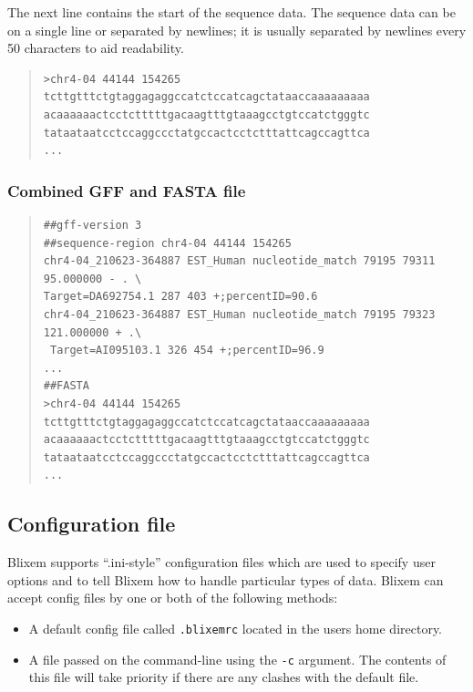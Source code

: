 \documentclass[letterpaper]{article}
\newcommand\textstyleSourceText[1]{\texttt{#1}}
\newcommand\liststyleLi{%
\renewcommand\labelitemi{{\textbullet}}
\renewcommand\labelitemii{{\textbullet}}
\renewcommand\labelitemiii{{\textbullet}}
\renewcommand\labelitemiv{{\textbullet}}
}
\begin{document}
{The next line contains the start of the sequence data. The sequence
data can be on a single line or separated by newlines; it is usually
separated by newlines every 50 characters to aid readability.}

\bigskip

\begin{quote}
\begin{verbatim}
>chr4-04 44144 154265
tcttgtttctgtaggagaggccatctccatcagctataaccaaaaaaaaa
acaaaaaactcctctttttgacaagtttgtaaagcctgtccatctgggtc
tataataatcctccaggccctatgccactcctctttattcagccagttca
...
\end{verbatim}
\end{quote}

{\color[rgb]{0.30980393,0.5058824,0.7411765}\subsubsection[Combined GFF and FASTA file]{Combined GFF and FASTA file}}

\begin{quote}
\begin{verbatim}
##gff-version 3
##sequence-region chr4-04 44144 154265
chr4-04_210623-364887 EST_Human nucleotide_match 79195 79311 95.000000 - . \
Target=DA692754.1 287 403 +;percentID=90.6
chr4-04_210623-364887 EST_Human nucleotide_match 79195 79323 121.000000 + .\
 Target=AI095103.1 326 454 +;percentID=96.9
...
##FASTA
>chr4-04 44144 154265
tcttgtttctgtaggagaggccatctccatcagctataaccaaaaaaaaa
acaaaaaactcctctttttgacaagtttgtaaagcctgtccatctgggtc
tataataatcctccaggccctatgccactcctctttattcagccagttca
...
\end{verbatim}
\end{quote}

{\color[rgb]{0.30980393,0.5058824,0.7411765}\subsection[Configuration file]{Configuration file}}
{Blixem supports {\textquotedblleft}.ini-style{\textquotedblright}
configuration files which are used to specify user options and to tell
Blixem how to handle particular types of data. Blixem can accept
config files by one or both of the following methods:}

\liststyleLi
\begin{itemize}
\item {
A default config file called \textstyleSourceText{\textrm{.blixemrc}}
located in the user{\textquotesingle}s home directory. }
\item {
A file passed on the command-line using the
\textstyleSourceText{\textrm{{}-c}} argument. The contents of this file
will take priority if there are any clashes with the default file. }
\end{itemize}
\end{document}
